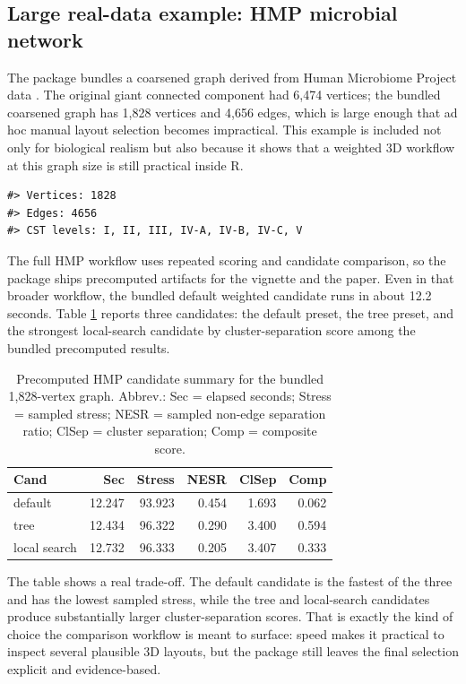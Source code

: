 \subsection{Large real-data example: HMP microbial network}\label{large-real-data-example-hmp-microbial-network}

The package bundles a coarsened graph derived from Human Microbiome Project
data \citep{hmp2012}. The original giant connected component had 6,474 vertices; the
bundled coarsened graph has 1,828 vertices and 4,656 edges, which is large
enough that ad hoc manual layout selection becomes impractical. This example is
included not only for biological realism but also because it shows that a
weighted 3D workflow at this graph size is still practical inside R.

\begin{verbatim}
#> Vertices: 1828
#> Edges: 4656
#> CST levels: I, II, III, IV-A, IV-B, IV-C, V
\end{verbatim}

The full HMP workflow uses repeated scoring and candidate comparison, so the
package ships precomputed artifacts for the vignette and the paper. Even in
that broader workflow, the bundled default weighted candidate runs in about
12.2
seconds. Table \ref{tab:hmp-summary} reports three candidates: the default
preset, the tree preset, and the strongest local-search candidate by
cluster-separation score among the bundled precomputed results.

\begin{table}

\caption{\label{tab:hmp-summary}Precomputed HMP candidate summary for the bundled 1,828-vertex graph. Abbrev.: Sec = elapsed seconds; Stress = sampled stress; NESR = sampled non-edge separation ratio; ClSep = cluster separation; Comp = composite score.}
\centering
\begin{tabular}[t]{l|r|r|r|r|r}
\hline
Cand & Sec & Stress & NESR & ClSep & Comp\\
\hline
default & 12.247 & 93.923 & 0.454 & 1.693 & 0.062\\
\hline
tree & 12.434 & 96.322 & 0.290 & 3.400 & 0.594\\
\hline
local search & 12.732 & 96.333 & 0.205 & 3.407 & 0.333\\
\hline
\end{tabular}
\end{table}

The table shows a real trade-off. The default candidate is the fastest of the
three and has the lowest sampled stress, while the tree and local-search
candidates produce substantially larger cluster-separation scores. That is
exactly the kind of choice the comparison workflow is meant to surface: speed
makes it practical to inspect several plausible 3D layouts, but the package
still leaves the final selection explicit and evidence-based.

